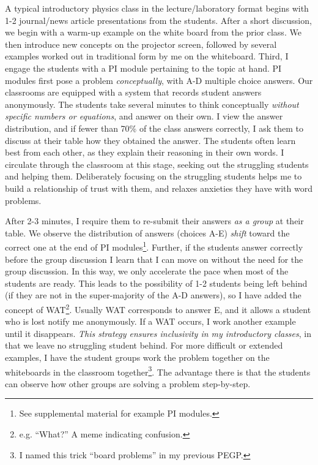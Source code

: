 \documentclass[../../../main.tex]{subfiles}
\begin{document}
A typical introductory physics class in the lecture/laboratory format begins with 1-2 journal/news article presentations from the students.  After a short discussion, we begin with a warm-up example on the white board from the prior class.  We then introduce new concepts on the projector screen, followed by several examples worked out in traditional form by me on the whiteboard.  Third, I engage the students with a PI module pertaining to the topic at hand.  PI modules first pose a problem \textit{conceptually}, with A-D multiple choice answers.  Our classrooms are equipped with a system that records student answers anonymously.  The students take several minutes to think conceptually \textit{without specific numbers or equations}, and answer on their own.  I view the answer distribution, and if fewer than 70\% of the class answers correctly, I ask them to discuss at their table how they obtained the answer.  The students often learn best from each other, as they explain their reasoning in their own words.  I circulate through the classroom at this stage, seeking out the struggling students and helping them.  Deliberately focusing on the struggling students helps me to build a relationship of trust with them, and relaxes anxieties they have with word problems.  \\ \hspace{0.1cm}

After 2-3 minutes, I require them to re-submit their answers \textit{as a group} at their table.  We observe the distribution of answers (choices A-E) \textit{shift} toward the correct one at the end of PI modules\footnote{See supplemental material for example PI modules.}.  Further, if the students answer correctly before the group discussion I learn that I can move on without the need for the group discussion.  In this way, we only accelerate the pace when most of the students are ready.  This leads to the possibility of 1-2 students being left behind (if they are not in the super-majority of the A-D answers), so I have added the concept of WAT\footnote{e.g. ``What?'' A meme indicating confusion.}.  Usually WAT corresponds to answer E, and it allows a student who is lost notify me anonymously.  If a WAT occurs, I work another example until it disappears.  \textit{This strategy ensures inclusivity in my introductory classes}, in that we leave no struggling student behind.  For more difficult or extended examples, I have the student groups work the problem together on the whiteboards in the classroom together\footnote{I named this trick ``board problems'' in my previous PEGP.}. The advantage there is that the students can observe how other groups are solving a problem step-by-step. \\ \hspace{0.1cm}
\end{document}
